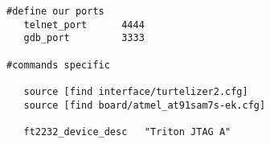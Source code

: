 \label{chap:triton-cfg} 
\begin{verbatim}
#define our ports
   telnet_port 		4444
   gdb_port 		3333

#commands specific

   source [find interface/turtelizer2.cfg]
   source [find board/atmel_at91sam7s-ek.cfg]

   ft2232_device_desc 	"Triton JTAG A"
\end{verbatim} 
